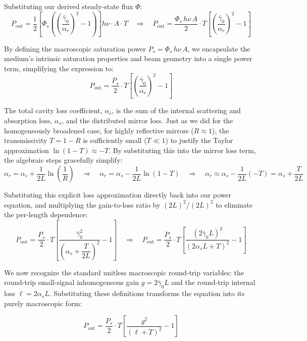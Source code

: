 Substituting our derived steady-state flux $\Phi$:
\begin{equation*}
    P_{\text{out}} = \frac{1}{2} \left[ \Phi_s \left( \left(\frac{\bar{\gamma}_0}{\alpha_r}\right)^{\!2} - 1 \right) \right] h\nu\cdot A\cdot T \quad \Rightarrow \quad P_{\text{out}} = \frac{\Phi_s\,h\nu\,A}{2}\cdot T\left[ \left(\frac{\bar{\gamma}_0}{\alpha_r}\right)^{\!2} - 1 \right]
\end{equation*}

By defining the macroscopic saturation power $P_s = \Phi_s\,h\nu\,A$, we encapsulate the medium's intrinsic saturation properties and beam geometry into a single power term, simplifying the expression to:
\begin{equation*}
    P_{\text{out}} = \frac{P_s}{2}\cdot T\left[ \left(\frac{\bar{\gamma}_0}{\alpha_r}\right)^{\!2} - 1 \right]
\end{equation*}

The total cavity loss coefficient, $\alpha_r$, is the sum of the internal scattering and absorption loss, $\alpha_s$, and the distributed mirror loss. Just as we did for the homogeneously broadened case, for highly reflective mirrors ($R \approx 1$), the transmissivity $T = 1 - R$ is sufficiently small ($T \ll 1$) to justify the Taylor approximation $\ln(1-T) \approx -T$. By substituting this into the mirror loss term, the algebraic steps gracefully simplify:
\begin{equation*}
    \alpha_r = \alpha_s + \frac{1}{2L}\ln\left(\frac{1}{R}\right) \quad \Rightarrow \quad \alpha_r = \alpha_s - \frac{1}{2L}\ln(1-T) \quad \Rightarrow \quad \alpha_r \approx \alpha_s - \frac{1}{2L}(-T) = \alpha_s + \frac{T}{2L}
\end{equation*}

Substituting this explicit loss approximation directly back into our power equation, and multiplying the gain-to-loss ratio by $(2L)^2 / (2L)^2$ to eliminate the per-length dependence:
\begin{equation*}
    P_{\text{out}} = \frac{P_s}{2}\cdot T\left[ \frac{\bar{\gamma}_0^2}{\left(\alpha_s + \dfrac{T}{2L}\right)^{\!2}} - 1 \right]
    \quad\Rightarrow\quad
    P_{\text{out}} = \frac{P_s}{2}\cdot T\left[ \frac{(2\bar{\gamma}_0 L)^2}{(2\alpha_s L + T)^2} - 1 \right]
\end{equation*}

We now recognize the standard unitless macroscopic round-trip variables: the round-trip small-signal inhomogeneous gain $g = 2\bar{\gamma}_0 L$ and the round-trip internal loss $\ell = 2\alpha_s L$. Substituting these definitions transforms the equation into its purely macroscopic form:
\begin{keyresult}
    \begin{equation}
        P_{\text{out}} = \frac{P_s}{2}\cdot T\left[ \frac{g^2}{(\ell + T)^2} - 1 \right]
    \end{equation}
\end{keyresult}

